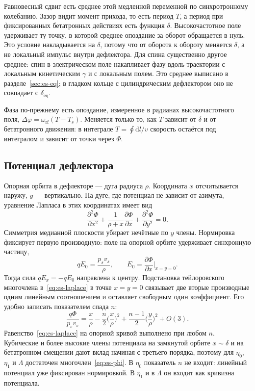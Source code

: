 Равновесный сдвиг есть среднее этой медленной переменной по синхротронному колебанию. Зазор видит момент прихода, то есть период $T$, а период при фиксированных бетатронных действиях есть функция $\delta$. Высокочастотное поле удерживает ту точку, в которой среднее опоздание за оборот обращается в нуль. Это условие накладывается на $\delta$, потому что от оборота к обороту меняется $\delta$, а не локальный импульс внутри дефлектора. Для спина существенно другое среднее: спин в электрическом поле накапливает фазу вдоль траектории с локальным кинетическим $\gamma$ и с локальным полем. Это среднее выписано в разделе~\ref{sec:es-eq}; в гладком кольце с цилиндрическим дефлектором оно не совпадает с $\delta_{\mathrm{eq}}$.

Фаза по-прежнему есть опоздание, измеренное в радианах высокочастотного поля, $\Delta\varphi=\omega_{\mathrm{rf}}(T-T_s)$. Меняется только то, как $T$ зависит от $\delta$ и от бетатронного движения: в интеграле $T=\oint\mathrm{d}l/v$ скорость остаётся под интегралом и зависит от точки через $\Phi$.

\subsection{Потенциал дефлектора}
\label{sec:es-phi}

Опорная орбита в дефлекторе --- дуга радиуса $\rho$. Координата $x$ отсчитывается наружу, $y$ --- вертикально. На дуге, где потенциал не зависит от азимута, уравнение Лапласа в этих координатах имеет вид
\begin{equation}
\label{eq:es-laplace}
\frac{\partial^2\Phi}{\partial x^2}+\frac{1}{\rho+x}\frac{\partial\Phi}{\partial x}+\frac{\partial^2\Phi}{\partial y^2}=0.
\end{equation}
Симметрия медианной плоскости убирает нечётные по $y$ члены. Нормировка фиксирует первую производную: поле на опорной орбите удерживает синхронную частицу,
\begin{equation}
\label{eq:es-norm}
qE_0=\frac{p_s v_s}{\rho},\qquad E_0=\frac{\partial\Phi}{\partial x}\bigg|_{x=y=0}.
\end{equation}
Тогда сила $qE_x=-qE_0$ направлена к центру. Подстановка тейлоровского многочлена в~\eqref{eq:es-laplace} в точке $x=y=0$ связывает две вторые производные одним линейным соотношением и оставляет свободным один коэффициент. Его удобно записать показателем спада $n$:
\begin{equation}
\label{eq:es-phi}
\frac{q\Phi}{p_s v_s}
=\frac{x}{\rho}-\frac{n}{2}\Biggl(\frac{x}{\rho}\Biggr)^2+\frac{n-1}{2}\Biggl(\frac{y}{\rho}\Biggr)^2+O(3).
\end{equation}
Равенство~\eqref{eq:es-laplace} на опорной кривой выполнено при любом $n$. Кубические и более высокие члены потенциала на замкнутой орбите $x\sim\delta$ и на бетатронном смещении дают вклад начиная с третьего порядка, поэтому для $\eta_0$, $\eta_1$ и $\Lambda$ достаточен многочлен~\eqref{eq:es-phi}. В $\eta_0$ показатель $n$ не входит: линейный потенциал уже фиксирован нормировкой. В $\eta_1$ и в $\Lambda$ он входит как кривизна потенциала.

